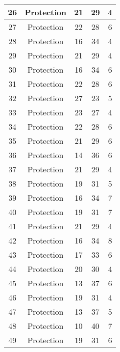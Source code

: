 \documentclass[results.tex]{subfiles}
\begin{document}
\begin{center}
\begin{tabular}{| c || c | c | c | c |}
    \hline
    26 & Protection & 21 & 29 & 4 \\ 
    \hline
    27 & Protection & 22 & 28 & 6 \\ 
    \hline
    28 & Protection & 16 & 34 & 4 \\ 
    \hline
    29 & Protection & 21 & 29 & 4 \\ 
    \hline
    30 & Protection & 16 & 34 & 6 \\ 
    \hline
    31 & Protection & 22 & 28 & 6 \\ 
    \hline
    32 & Protection & 27 & 23 & 5 \\ 
    \hline
    33 & Protection & 23 & 27 & 4 \\ 
    \hline
    34 & Protection & 22 & 28 & 6 \\ 
    \hline
    35 & Protection & 21 & 29 & 6 \\ 
    \hline
    36 & Protection & 14 & 36 & 6 \\ 
    \hline
    37 & Protection & 21 & 29 & 4 \\ 
    \hline
    38 & Protection & 19 & 31 & 5 \\ 
    \hline
    39 & Protection & 16 & 34 & 7 \\ 
    \hline
    40 & Protection & 19 & 31 & 7 \\ 
    \hline
    41 & Protection & 21 & 29 & 4 \\ 
    \hline
    42 & Protection & 16 & 34 & 8 \\ 
    \hline
    43 & Protection & 17 & 33 & 6 \\ 
    \hline
    44 & Protection & 20 & 30 & 4 \\ 
    \hline
    45 & Protection & 13 & 37 & 6 \\ 
    \hline
    46 & Protection & 19 & 31 & 4 \\ 
    \hline
    47 & Protection & 13 & 37 & 5 \\ 
    \hline
    48 & Protection & 10 & 40 & 7 \\ 
    \hline
    49 & Protection & 19 & 31 & 6 \\ 
    \hline   \end{tabular}
\end{center}
\end{document}
